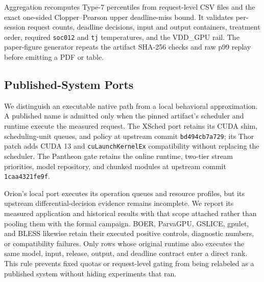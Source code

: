 Aggregation recomputes Type-7 percentiles from request-level CSV files and the
exact one-sided Clopper--Pearson upper deadline-miss bound.  It validates
per-session request counts, deadline decisions, input and output containers,
treatment order, required \texttt{soc012} and \texttt{tj} temperatures, and
the VDD\_GPU rail.  The paper-figure generator repeats the artifact SHA-256
checks and raw p99 replay before emitting a PDF or table.

\subsection{Published-System Ports}

We distinguish an executable native path from a local behavioral
approximation.  A published name is admitted only when the pinned artifact's
scheduler and runtime execute the measured request.  The XSched port retains
its CUDA shim, scheduling-unit queues,
and policy at upstream commit \texttt{bd494cb7a729}; its Thor patch adds CUDA 13
and \texttt{cuLaunchKernelEx} compatibility without replacing the scheduler.
The Pantheon gate retains the online runtime, two-tier stream priorities,
model repository, and chunked modules at upstream commit
\texttt{1caa4321fe9f}.

Orion's local port executes its operation queues and resource profiles, but
its upstream differential-decision evidence remains incomplete.  We report
its measured application and historical results with that scope attached
rather than pooling them with the formal campaign.  BOER, ParvaGPU, GSLICE,
gpulet, and BLESS likewise retain their executed positive controls, diagnostic
numbers, or compatibility failures.  Only rows whose original runtime also
executes the same model, input, release, output, and deadline contract enter a
direct rank.  This rule prevents fixed quotas or request-level gating from
being relabeled as a published system without hiding experiments that ran.
